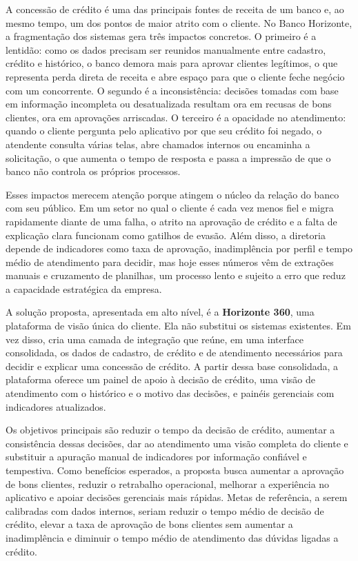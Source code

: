 \documentclass[12pt,a4paper]{article}
\begin{document}
A concess\~ao de cr\'edito \'e uma das principais fontes de receita de um banco e, ao mesmo tempo, um dos pontos de maior atrito com o cliente. No Banco Horizonte, a fragmenta\c{c}\~ao dos sistemas gera tr\^es impactos concretos. O primeiro \'e a lentid\~ao: como os dados precisam ser reunidos manualmente entre cadastro, cr\'edito e hist\'orico, o banco demora mais para aprovar clientes leg\'itimos, o que representa perda direta de receita e abre espa\c{c}o para que o cliente feche neg\'ocio com um concorrente. O segundo \'e a inconsist\^encia: decis\~oes tomadas com base em informa\c{c}\~ao incompleta ou desatualizada resultam ora em recusas de bons clientes, ora em aprova\c{c}\~oes arriscadas. O terceiro \'e a opacidade no atendimento: quando o cliente pergunta pelo aplicativo por que seu cr\'edito foi negado, o atendente consulta v\'arias telas, abre chamados internos ou encaminha a solicita\c{c}\~ao, o que aumenta o tempo de resposta e passa a impress\~ao de que o banco n\~ao controla os pr\'oprios processos.

Esses impactos merecem aten\c{c}\~ao porque atingem o n\'ucleo da rela\c{c}\~ao do banco com seu p\'ublico. Em um setor no qual o cliente \'e cada vez menos fiel e migra rapidamente diante de uma falha, o atrito na aprova\c{c}\~ao de cr\'edito e a falta de explica\c{c}\~ao clara funcionam como gatilhos de evas\~ao. Al\'em disso, a diretoria depende de indicadores como taxa de aprova\c{c}\~ao, inadimpl\^encia por perfil e tempo m\'edio de atendimento para decidir, mas hoje esses n\'umeros v\^em de extra\c{c}\~oes manuais e cruzamento de planilhas, um processo lento e sujeito a erro que reduz a capacidade estrat\'egica da empresa.

A solu\c{c}\~ao proposta, apresentada em alto n\'ivel, \'e a \textbf{Horizonte 360}, uma plataforma de vis\~ao \'unica do cliente. Ela n\~ao substitui os sistemas existentes. Em vez disso, cria uma camada de integra\c{c}\~ao que re\'une, em uma interface consolidada, os dados de cadastro, de cr\'edito e de atendimento necess\'arios para decidir e explicar uma concess\~ao de cr\'edito. A partir dessa base consolidada, a plataforma oferece um painel de apoio \`a decis\~ao de cr\'edito, uma vis\~ao de atendimento com o hist\'orico e o motivo das decis\~oes, e pain\'eis gerenciais com indicadores atualizados.

Os objetivos principais s\~ao reduzir o tempo da decis\~ao de cr\'edito, aumentar a consist\^encia dessas decis\~oes, dar ao atendimento uma vis\~ao completa do cliente e substituir a apura\c{c}\~ao manual de indicadores por informa\c{c}\~ao confi\'avel e tempestiva. Como benef\'icios esperados, a proposta busca aumentar a aprova\c{c}\~ao de bons clientes, reduzir o retrabalho operacional, melhorar a experi\^encia no aplicativo e apoiar decis\~oes gerenciais mais r\'apidas. Metas de refer\^encia, a serem calibradas com dados internos, seriam reduzir o tempo m\'edio de decis\~ao de cr\'edito, elevar a taxa de aprova\c{c}\~ao de bons clientes sem aumentar a inadimpl\^encia e diminuir o tempo m\'edio de atendimento das d\'uvidas ligadas a cr\'edito.
\end{document}
